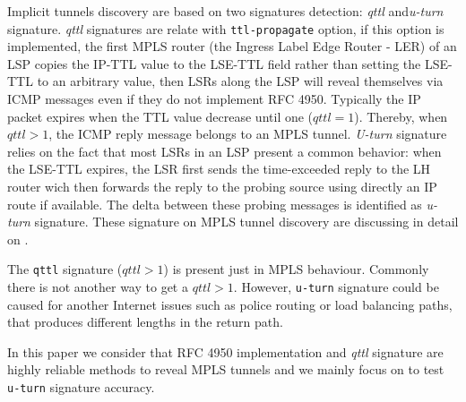 Implicit tunnels discovery are based on two signatures detection: \textit{qttl}
and\textit{u-turn} signature. \textit{qttl} signatures are relate with
\texttt{ttl-propagate} option, if this option is implemented, the first MPLS
router (the Ingress Label Edge Router - LER) of an LSP copies the IP-TTL value
to the LSE-TTL field rather than setting the LSE-TTL to an arbitrary value, then
LSRs along the LSP will reveal themselves via ICMP messages even if they do not
implement RFC 4950. Typically the IP packet expires when the TTL value decrease
until one ($qttl=1$). Thereby, when $qttl>1$, the ICMP reply message belongs to
an MPLS tunnel. \textit{U-turn} signature relies on the fact that most LSRs in an LSP
present a common behavior: when the LSE-TTL expires, the LSR first sends the
time-exceeded reply to the LH router wich then forwards the reply to the
probing source using directly an IP route if available. The delta between
these probing messages is identified as \textit{u-turn} signature. These
signature on MPLS tunnel discovery are discussing in detail on\cite{Donnet12} .

The \texttt{qttl} signature ($qttl>1$) is present just in MPLS behaviour.
Commonly there is not another way to get a $qttl>1$. However, \texttt{u-turn}
signature could be caused for another Internet issues such as police routing or
load balancing paths, that produces different lengths in the return path. 

In this paper we consider that RFC 4950 implementation and \textit{qttl} signature are
highly reliable methods to reveal MPLS tunnels and we mainly focus on to test
\texttt{u-turn} signature accuracy.


